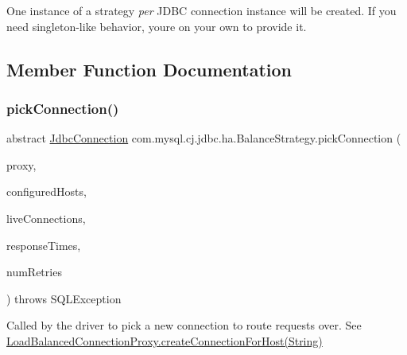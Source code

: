 One instance of a strategy {\itshape per} J\+D\+BC connection instance will be created. If you need singleton-\/like behavior, you\textquotesingle{}re on your own to provide it. 

\subsection{Member Function Documentation}
\mbox{\label{interfacecom_1_1mysql_1_1cj_1_1jdbc_1_1ha_1_1_balance_strategy_a754b8e7a4e4baad812f650b3222cfbd5}} 
\subsubsection{\texorpdfstring{pick\+Connection()}{pickConnection()}}
{\footnotesize\ttfamily abstract \mbox{\hyperlink{interfacecom_1_1mysql_1_1cj_1_1jdbc_1_1_jdbc_connection}{Jdbc\+Connection}} com.\+mysql.\+cj.\+jdbc.\+ha.\+Balance\+Strategy.\+pick\+Connection (\begin{DoxyParamCaption}\item[{Invocation\+Handler}]{proxy,  }\item[{List$<$ String $>$}]{configured\+Hosts,  }\item[{Map$<$ String, \mbox{\hyperlink{interfacecom_1_1mysql_1_1cj_1_1jdbc_1_1_jdbc_connection}{Jdbc\+Connection}} $>$}]{live\+Connections,  }\item[{long \mbox{[}$\,$\mbox{]}}]{response\+Times,  }\item[{int}]{num\+Retries }\end{DoxyParamCaption}) throws S\+Q\+L\+Exception\hspace{0.3cm}{\ttfamily [abstract]}}

Called by the driver to pick a new connection to route requests over. See \mbox{\hyperlink{classcom_1_1mysql_1_1cj_1_1jdbc_1_1ha_1_1_load_balanced_connection_proxy_a27662d65e82acb86f3cc6af3f4f331ee}{Load\+Balanced\+Connection\+Proxy.\+create\+Connection\+For\+Host(\+String)}}


